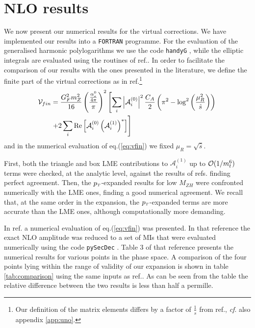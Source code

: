 \section{NLO results} \label{sec:sei}
We now present our numerical results for the virtual corrections.
We have implemented our results into a \texttt{FORTRAN} programme. 
For the evaluation of the generalised harmonic polylogarithms we use 
the code \texttt{handyG} \cite{Naterop:2019xaf}, while 
the elliptic integrals are evaluated using the routines of
ref.\cite{Bonciani:2018uvv}.
In order to facilitate the comparison of our results with the ones
presented in the literature,  we define the finite part of the virtual corrections
as in
ref.\cite{Davies:2020drs}\footnote{Our definition of the matrix elements
	differs by a factor of
	$\frac{1}{\hat{s}}$ from ref.\cite{Davies:2020drs}, \textit{cf}. also
	appendix \ref{app:uno}.}
\begin{equation}
	\begin{split}
		\mathcal{V}_{fin}&=\frac{G_F^2 m_Z^2}{16}\left(\frac{\frac{\alpha_s^0}{4 \pi}}{\pi}\right)^2
		\left[ \sum_{i} \left|\mathcal{A}_i^{(0)} \right|^2\frac{C_A}{2}\left(\pi^2-
		\log^2\left(\frac{\mu_R^2}{\hat{s}}\right)\right)\right. \\
		& \left. +2\sum_i\text{Re}\left[\mathcal{A}_i^{(0)}\left(\mathcal{A}_i^{(1)}\right)^*\right]\right]\,
		\label{eq:vfin}
	\end{split}
\end{equation}
and in the numerical evaluation of eq.(\ref{eq:vfin}) we fixed
$\mu_R= \sqrt{\hat{s}}$.

First, both the triangle and box LME contributions to $\mathcal{A}_i^{(1)}$ up
to $\mathcal{O}(1/m_t^6)$ terms  were checked, at the analytic level, against
the results of refs.\cite{Hasselhuhn:2016rqt,Davies:2020drs} finding perfect
agreement. Then,  the $p_{\scriptscriptstyle T}$-expanded results for low $M_{ZH}$ were
confronted numerically with the LME ones, finding a  good numerical agreement.
We recall that, at the same order in the expansion, 
the $p_{\scriptscriptstyle T}$-expanded terms are more accurate than
the LME ones, although computationally more demanding.

In ref.\cite{Chen:2020gae} a numerical evaluation of eq.(\ref{eq:vfin})
was presented. In that reference the exact NLO amplitude was reduced to a
set of MIs that were evaluated numerically using the code \texttt{pySecDec}
\cite{Borowka:2017idc,Borowka:2018goh}. Table 3 of that reference presents
the numerical results %
for various points in the
phase space. A comparison of the four points lying within the range of
validity of our expansion is shown in table \ref{tab:comparison}
using the same inputs as ref.\cite{Chen:2020gae}.
As can be seen from the table the relative difference 
between the two results is less than half a permille.

